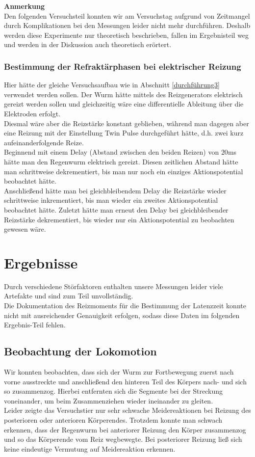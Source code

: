 \documentclass[11pt]{article}
\begin{document}
\textbf{Anmerkung}\\
Den folgenden Versuchsteil konnten wir am Versuchstag aufgrund von Zeitmangel durch Komplikationen bei den Messungen leider nicht mehr durchführen. Deshalb werden diese Experimente nur theoretisch beschrieben, fallen im Ergebnisteil weg und werden in der Diskussion auch theoretisch erörtert. 



\subsubsection{Bestimmung der Refraktärphasen bei elektrischer Reizung}
Hier hätte der gleiche Versuchsaufbau wie in Abschnitt \ref{durchführung3} verwendet werden sollen. Der Wurm hätte mittels des Reizgenerators elektrisch gereizt werden sollen und gleichzeitig wäre eine differentielle Ableitung über die Elektroden erfolgt. \\
Diesmal wäre aber die Reizstärke konstant geblieben, während man dagegen aber eine Reizung mit der Einstellung \glqq Twin Pulse\grqq{} durchgeführt hätte, d.h. zwei kurz aufeinanderfolgende Reize. \\
Beginnend mit einem Delay (Abstand zwischen den beiden Reizen) von $20$ms hätte man den Regenwurm elektrisch gereizt. Diesen zeitlichen Abstand hätte man schrittweise dekrementiert, bis man nur noch ein einziges Aktionspotential beobachtet hätte. \\
Anschließend hätte man bei gleichbleibendem Delay die Reizstärke wieder schrittweise inkrementiert, bis man wieder ein zweites Aktionspotential beobachtet hätte. Zuletzt hätte man erneut den Delay bei gleichbleibender Reizstärke dekrementiert, bis wieder nur ein Aktionspotential zu beobachten gewesen wäre. 


\section{Ergebnisse}
Durch verschiedene Störfaktoren enthalten unsere Messungen leider viele Artefakte und sind zum Teil unvollständig.  \\
Die Dokumentation des Reizmoments für die Bestimmung der Latenzzeit konnte nicht mit ausreichender Genauigkeit erfolgen, sodass diese Daten im folgenden Ergebnis-Teil fehlen. \\

\subsection{Beobachtung der Lokomotion}
Wir konnten beobachten, dass sich der Wurm zur Fortbewegung zuerst nach vorne ausstreckte und anschließend den hinteren Teil des Körpers nach- und sich so zusammenzog. Hierbei entfernten sich die Segmente bei der Streckung voneinander, um beim Zusammenziehen wieder ineinander zu gleiten.\\
Leider zeigte das Versuchstier nur sehr schwache Meidereaktionen bei Reizung des posterioren oder anterioren Körperendes. Trotzdem konnte man schwach erkennen, dass der Regenwurm bei anteriorer Reizung den Körper zusammenzog und so das Körperende vom Reiz wegbewegte. Bei posteriorer Reizung ließ sich keine eindeutige Vermutung auf Meidereaktion erkennen. 
\end{document}
